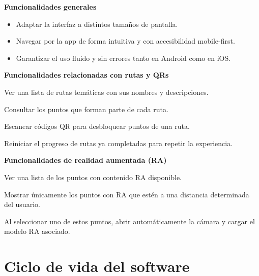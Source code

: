 \vspace{0.3cm}

\textbf{\textsf{\large Funcionalidades generales}}

\vspace{0.3cm}

\begin{itemize}
    \item[F28.] Adaptar la interfaz a distintos tamaños de pantalla.
    \item[F29.] Navegar por la app de forma intuitiva y con accesibilidad mobile-first.
    \item[F30.] Garantizar el uso fluido y sin errores tanto en Android como en iOS.
\end{itemize}

\vspace{0.3cm}

\textbf{\textsf{\large Funcionalidades relacionadas con rutas y QRs}}

\vspace{0.3cm}

\item[F31.] Ver una lista de rutas temáticas con sus nombres y descripciones.
\item[F32.] Consultar los puntos que forman parte de cada ruta.
\item[F33.] Escanear códigos QR para desbloquear puntos de una ruta.
\item[F34.] Reiniciar el progreso de rutas ya completadas para repetir la experiencia.

\vspace{0.3cm}

\textbf{\textsf{\large Funcionalidades de realidad aumentada (RA)}}

\vspace{0.3cm}

\item[F35.] Ver una lista de los puntos con contenido RA disponible.
\item[F36.] Mostrar únicamente los puntos con RA que estén a una distancia determinada del usuario.
\item[F37.] Al seleccionar uno de estos puntos, abrir automáticamente la cámara y cargar el modelo RA asociado.
\vspace{0.3cm}




\section{Ciclo de vida del software}

